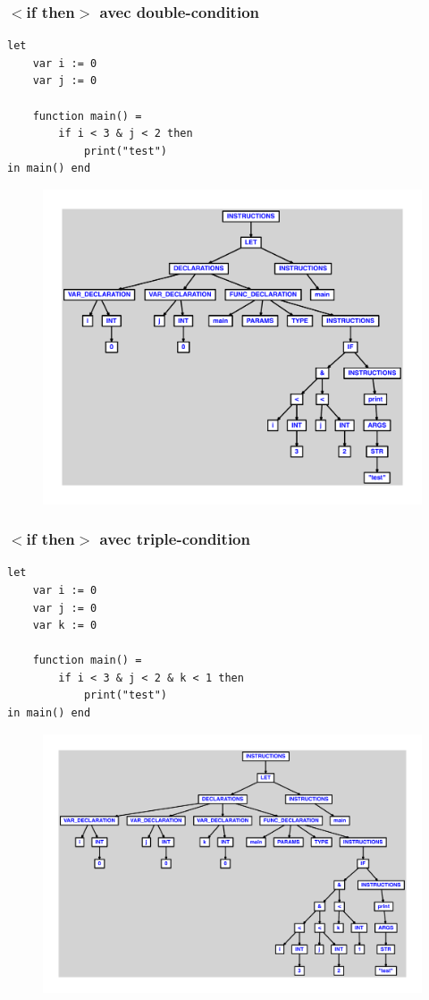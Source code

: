 \documentclass{article}
\begin{document}
\subsubsection{$ < $if then$ > $ avec double-condition}
\begin{lstlisting}
let
	var i := 0
	var j := 0

	function main() =
		if i < 3 & j < 2 then
			print("test")
in main() end
\end{lstlisting}
\newpage
\begin{figure}[H]
\centering
\includegraphics[max width=\textwidth]{ast/ast_261.pdf}
\end{figure}
\newpage
\subsubsection{$ < $if then$ > $ avec triple-condition}
\begin{lstlisting}
let
	var i := 0
	var j := 0
	var k := 0

	function main() =
		if i < 3 & j < 2 & k < 1 then
			print("test")
in main() end
\end{lstlisting}
\newpage
\begin{figure}[H]
\centering
\includegraphics[max width=\textwidth]{ast/ast_262.pdf}
\end{figure}
\newpage
\end{document}
